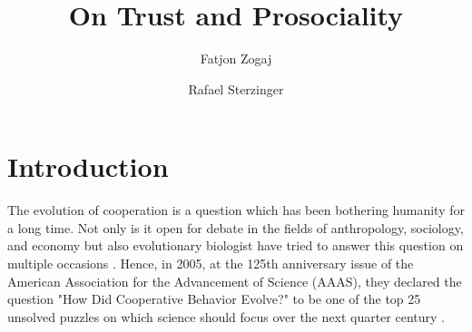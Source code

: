 \documentclass[sigconf]{acmart}
\newcommand{\todo}[1]{{\color{red}{#1}}}
\begin{document}
    \title{On Trust and Prosociality}

    \author{Fatjon Zogaj}\affiliation{}

    \author{Rafael Sterzinger}\affiliation{}

    \begin{abstract}
    \end{abstract}

    \maketitle


    \section{Introduction}\label{sec:introduction}


    The evolution of cooperation is a question which has been bothering humanity for a long time.
    Not only is it open for debate in the fields of anthropology, sociology, and economy but also evolutionary biologist have tried to answer this question on multiple occasions \cite{gardner_theory_2009}.
    Hence, in 2005, at the 125th anniversary issue of the American Association for the Advancement of Science (AAAS), they declared the question "How Did Cooperative Behavior Evolve?" to be one of the top 25 unsolved puzzles on which science should focus over the next quarter century \cite{aaas_125th_2005}.
\end{document}
